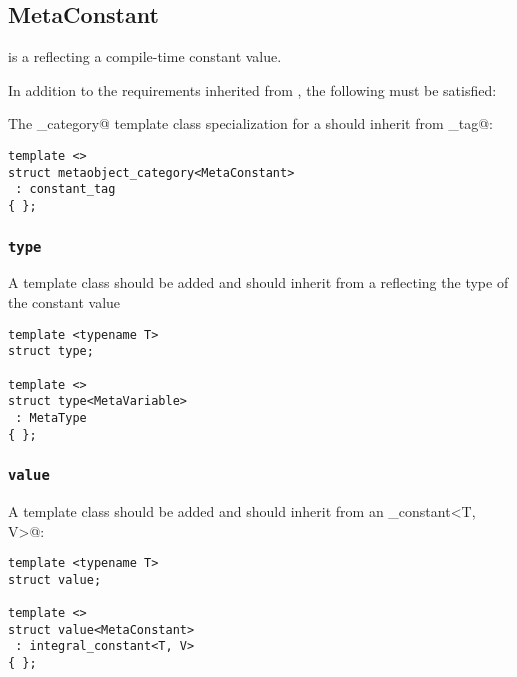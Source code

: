 \subsection{MetaConstant}
\label{concept-MetaConstant}

 is a  reflecting a compile-time constant value.

In addition to the requirements inherited from , the following must
be satisfied:

The \verb@metaobject_category@ template class specialization for a  should
inherit from \verb@constant_tag@:

\begin{verbatim}
template <>
struct metaobject_category<MetaConstant>
 : constant_tag
{ };
\end{verbatim}

\subsubsection{\texttt{type}}

A template class \verb@type@ should be added and should inherit
from a  reflecting the type of the constant value

\begin{verbatim}
template <typename T>
struct type;

template <>
struct type<MetaVariable>
 : MetaType
{ };
\end{verbatim}

\subsubsection{\texttt{value}}

A template class \verb@value@ should be added and should inherit
from an \verb@integral_constant<T, V>@:

\begin{verbatim}
template <typename T>
struct value;

template <>
struct value<MetaConstant>
 : integral_constant<T, V>
{ };
\end{verbatim}

